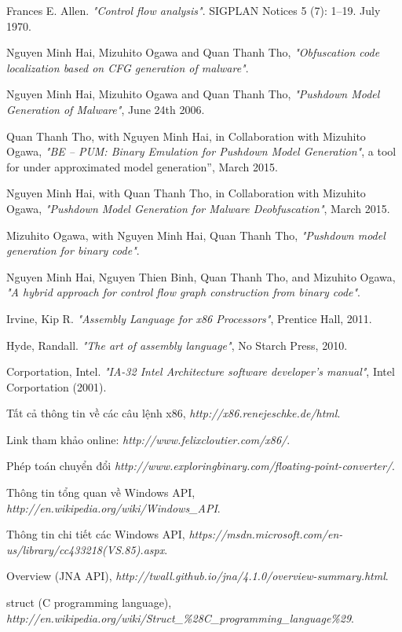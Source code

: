 
\begin{thebibliography}{}

Frances E. Allen. \emph{"Control flow analysis"}. SIGPLAN Notices 5 (7): 1–19. July 1970.

\bibitem{}
Nguyen Minh Hai, Mizuhito Ogawa and Quan Thanh Tho, \emph{"Obfuscation code localization based on CFG generation of malware"}.

\bibitem{}
Nguyen Minh Hai, Mizuhito Ogawa and Quan Thanh Tho, \emph{"Pushdown Model Generation of Malware"}, June 24th 2006.

\bibitem{}
Quan Thanh Tho, with Nguyen Minh Hai, in Collaboration with Mizuhito Ogawa, \emph{"BE – PUM: Binary Emulation for Pushdown Model Generation"}, a tool for under approximated model generation”, March 2015.	

\bibitem{}
Nguyen Minh Hai, with Quan Thanh Tho, in Collaboration with Mizuhito Ogawa, \emph{"Pushdown Model Generation for Malware Deobfuscation"}, March 2015.

\bibitem{}
Mizuhito Ogawa, with Nguyen Minh Hai, Quan Thanh Tho, \emph{"Pushdown model generation for binary code"}.

\bibitem{}
Nguyen Minh Hai, Nguyen Thien Binh, Quan Thanh Tho, and Mizuhito Ogawa, \emph{"A hybrid approach for control flow graph construction from binary code"}.

\bibitem{} 
Irvine, Kip R. \emph{"Assembly Language for x86 Processors"}, Prentice Hall, 2011. 

\bibitem{}
Hyde, Randall. \emph{"The art of assembly language"}, No Starch Press, 2010.

\bibitem{}
Corportation, Intel. \emph{"IA-32 Intel Architecture software developer’s manual"}, Intel Corportation (2001).

\bibitem{}
Tất cả thông tin về các câu lệnh x86, \emph{http://x86.renejeschke.de/html}.

\bibitem{}
Link tham khảo online: \emph{http://www.felixcloutier.com/x86/}.

\bibitem{}
Phép toán chuyển đổi \emph{http://www.exploringbinary.com/floating-point-converter/}.

\bibitem{}
Thông tin tổng quan về Windows API, \emph{http://en.wikipedia.org/wiki/Windows\_API}.

\bibitem{}
Thông tin chi tiết các Windows API, \emph{https://msdn.microsoft.com/en-us/library/cc433218(VS.85).aspx}.

\bibitem{}
Overview (JNA API), \emph{http://twall.github.io/jna/4.1.0/overview-summary.html}.

\bibitem{}
struct (C programming language), \emph{http://en.wikipedia.org/wiki/Struct\_\%28C\_programming\_language\%29}.

\end{thebibliography}
